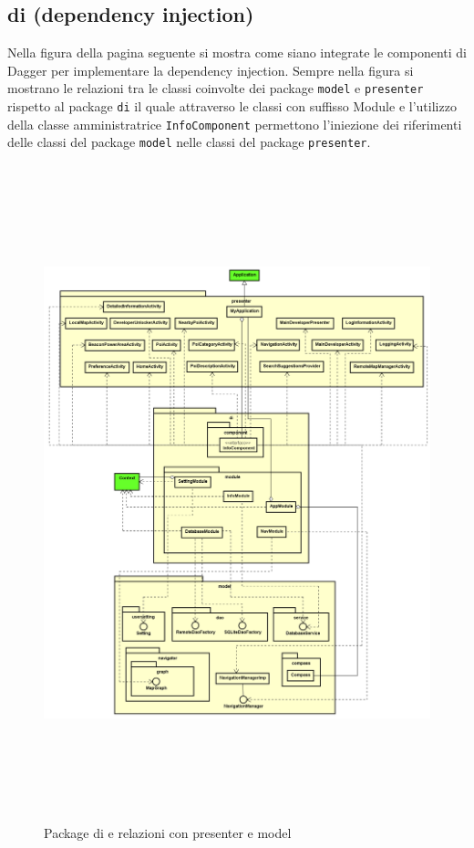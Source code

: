 \documentclass[../DefinizioneDiProdotto.tex,lanscape]{subfiles}
\begin{document}
\newpage
	\subsection{di (dependency injection)}
		Nella figura della pagina seguente si mostra come siano integrate le componenti di Dagger per implementare la dependency injection. Sempre nella figura si mostrano le relazioni tra le classi coinvolte dei package \verb|model| e \verb|presenter| rispetto al package \verb|di| il quale attraverso le classi con suffisso Module e l'utilizzo della classe amministratrice \verb|InfoComponent| permettono l'iniezione dei riferimenti delle classi del package \verb|model| nelle classi del package \verb|presenter|.
	
	
\begin{figure}[p]
	\centering
	\includegraphics[height=19cm,width=\textwidth]{img/RelationPackage/di}
	\caption{Package di e relazioni con presenter e model}
	\label{diPackage}
\end{figure}
\end{document}
